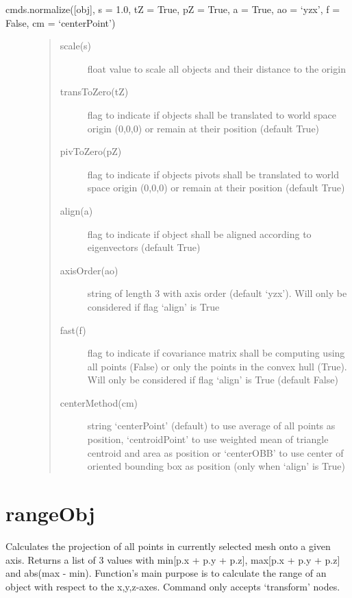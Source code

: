 \documentclass[letterpaper,10pt,english]{sphinxmanual}
\begin{document}
 cmds.normalize({[}obj{]}, s = 1.0, tZ = True, pZ = True, a = True, ao = ‘yzx’, f = False, cm = ‘centerPoint’)
\begin{description}
\item[{}] \leavevmode\begin{quote}\begin{description}
\item[{scale(s)}] \leavevmode
float value to scale all objects and their distance to the origin

\item[{transToZero(tZ)}] \leavevmode
flag to indicate if objects shall be translated to world space origin (0,0,0) or remain at their position (default True)

\item[{pivToZero(pZ)}] \leavevmode
flag to indicate if objects pivots shall be translated to world space origin (0,0,0) or remain at their position (default True)

\item[{align(a)}] \leavevmode
flag to indicate if object shall be aligned according to eigenvectors (default True)

\item[{axisOrder(ao)}] \leavevmode
string of length 3 with axis order (default ‘yzx’). Will only be considered if flag ‘align’ is True

\item[{fast(f)}] \leavevmode
flag to indicate if covariance matrix shall be computing using all points (False) or only the points in the convex hull (True). Will only be considered if flag ‘align’ is True (default False)

\item[{centerMethod(cm)}] \leavevmode
string ‘centerPoint’ (default) to use average of all points as position, ‘centroidPoint’ to use weighted mean of triangle centroid and area as position or ‘centerOBB’ to use center of oriented bounding box as position (only when ‘align’ is True)

\end{description}\end{quote}

\end{description}


\section{rangeObj}
\label{\detokenize{pk_src.rangeObj::doc}}\label{\detokenize{pk_src.rangeObj:rangeobj}}\label{\detokenize{pk_src.rangeObj:id1}}
{\hyperref[\detokenize{index:commands}]{}}
\label{\detokenize{pk_src.rangeObj:module-pk_src.rangeObj}}
Calculates the projection of all points in currently selected mesh onto a given axis. Returns a list of 3 values with min{[}p.x + p.y + p.z{]}, max{[}p.x + p.y + p.z{]} and abs(max - min). Function’s main purpose is to calculate the range of an object with respect to the x,y,z-axes.
Command only accepts ‘transform’ nodes.
\end{document}
